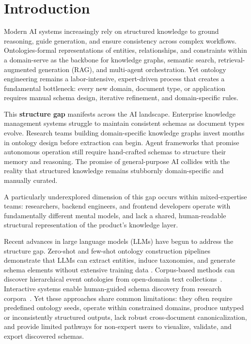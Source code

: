 \documentclass[runningheads,a4paper]{llncs}
\begin{document}
\section{Introduction}
\label{sec:intro}

Modern AI systems increasingly rely on structured knowledge to ground
reasoning, guide generation, and ensure consistency across complex
workflows. Ontologies-formal representations of entities,
relationships, and constraints within a domain-serve as the backbone
for knowledge graphs, semantic search, retrieval-augmented generation
(RAG), and multi-agent orchestration. Yet ontology engineering remains a
labor-intensive, expert-driven process that creates a fundamental
bottleneck: every new domain, document type, or application requires
manual schema design, iterative refinement, and domain-specific rules.

This \textbf{structure gap} manifests across the AI landscape.
Enterprise knowledge management systems struggle to maintain consistent
schemas as document types evolve. Research teams building
domain-specific knowledge graphs invest months in ontology design before
extraction can begin. Agent frameworks that promise autonomous operation
still require hand-crafted schemas to structure their memory and
reasoning. The promise of general-purpose AI collides with the reality
that structured knowledge remains stubbornly domain-specific and
manually curated.

A particularly underexplored dimension of this gap occurs within
mixed-expertise teams: researchers, backend engineers, and frontend
developers operate with fundamentally different mental models, and lack
a shared, human-readable structural representation of the product's
knowledge layer.

Recent advances in large language models (LLMs) have begun to address
the structure gap. Zero-shot and few-shot ontology construction pipelines
demonstrate that LLMs can extract entities, induce taxonomies, and
generate schema elements without extensive training data
\cite{beliaeva2025,giglou2023llms4ol,giglou2024llms4ol_overview}. Corpus-based
methods can discover hierarchical event ontologies from open-domain text
collections~\cite{zhang2023ceo}. Interactive systems enable human-guided
schema discovery from research corpora~\cite{sadruddin2025}. Yet these
approaches share common limitations: they often require predefined
ontology seeds, operate within constrained domains, produce untyped or
inconsistently structured outputs, lack robust cross-document
canonicalization, and provide limited pathways for non-expert users to
visualize, validate, and export discovered schemas.
\end{document}
